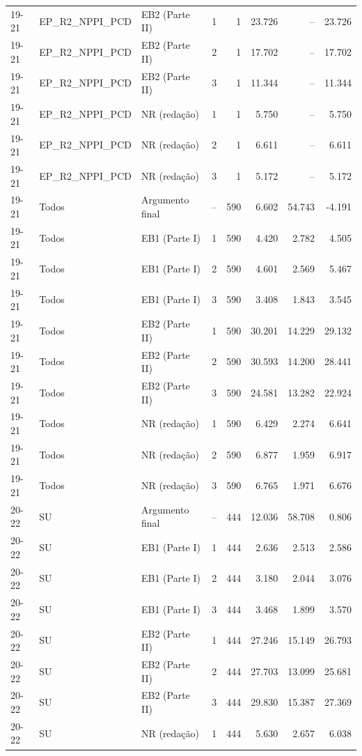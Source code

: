 \begin{longtable}{lllcrrrr}
19-21 & EP\_R2\_NPPI\_PCD & EB2 (Parte II) & 1 & 1 & 23.726 & -- & 23.726 \\
19-21 & EP\_R2\_NPPI\_PCD & EB2 (Parte II) & 2 & 1 & 17.702 & -- & 17.702 \\
19-21 & EP\_R2\_NPPI\_PCD & EB2 (Parte II) & 3 & 1 & 11.344 & -- & 11.344 \\
19-21 & EP\_R2\_NPPI\_PCD & NR (redação) & 1 & 1 & 5.750 & -- & 5.750 \\
19-21 & EP\_R2\_NPPI\_PCD & NR (redação) & 2 & 1 & 6.611 & -- & 6.611 \\
19-21 & EP\_R2\_NPPI\_PCD & NR (redação) & 3 & 1 & 5.172 & -- & 5.172 \\
19-21 & Todos & Argumento final & -- & 590 & 6.602 & 54.743 & -4.191 \\
19-21 & Todos & EB1 (Parte I) & 1 & 590 & 4.420 & 2.782 & 4.505 \\
19-21 & Todos & EB1 (Parte I) & 2 & 590 & 4.601 & 2.569 & 5.467 \\
19-21 & Todos & EB1 (Parte I) & 3 & 590 & 3.408 & 1.843 & 3.545 \\
19-21 & Todos & EB2 (Parte II) & 1 & 590 & 30.201 & 14.229 & 29.132 \\
19-21 & Todos & EB2 (Parte II) & 2 & 590 & 30.593 & 14.200 & 28.441 \\
19-21 & Todos & EB2 (Parte II) & 3 & 590 & 24.581 & 13.282 & 22.924 \\
19-21 & Todos & NR (redação) & 1 & 590 & 6.429 & 2.274 & 6.641 \\
19-21 & Todos & NR (redação) & 2 & 590 & 6.877 & 1.959 & 6.917 \\
19-21 & Todos & NR (redação) & 3 & 590 & 6.765 & 1.971 & 6.676 \\
\midrule
20-22 & SU & Argumento final & -- & 444 & 12.036 & 58.708 & 0.806 \\
20-22 & SU & EB1 (Parte I) & 1 & 444 & 2.636 & 2.513 & 2.586 \\
20-22 & SU & EB1 (Parte I) & 2 & 444 & 3.180 & 2.044 & 3.076 \\
20-22 & SU & EB1 (Parte I) & 3 & 444 & 3.468 & 1.899 & 3.570 \\
20-22 & SU & EB2 (Parte II) & 1 & 444 & 27.246 & 15.149 & 26.793 \\
20-22 & SU & EB2 (Parte II) & 2 & 444 & 27.703 & 13.099 & 25.681 \\
20-22 & SU & EB2 (Parte II) & 3 & 444 & 29.830 & 15.387 & 27.369 \\
20-22 & SU & NR (redação) & 1 & 444 & 5.630 & 2.657 & 6.038 \\

\end{longtable}
